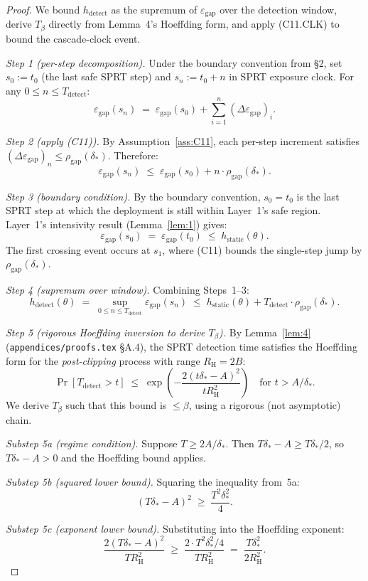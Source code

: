 \documentclass{article}
\newcommand{\deltastar}{\delta_{*}}
\newcommand{\rhogap}{\rho_{\mathrm{gap}}}
\newcommand{\epsgap}{\varepsilon_{\mathrm{gap}}}
\newcommand{\Tbeta}{T_{\beta}}
\newcommand{\Bclip}{B}
\newcommand{\Rh}{R_{\mathrm{H}}}
\begin{document}
\begin{proof}
We bound $h_{\mathrm{detect}}$ as the supremum of $\epsgap$ over
the detection window, derive $\Tbeta$ directly from Lemma~4's
Hoeffding form, and apply (C11.CLK) to bound the cascade-clock
event.

\emph{Step 1 (per-step decomposition).}  Under the boundary
convention from §2, set $s_0 := t_0$ (the last safe SPRT step) and
$s_n := t_0 + n$ in SPRT exposure clock.  For any
$0 \leq n \leq T_{\mathrm{detect}}$:
\[
  \epsgap(s_n) \;=\; \epsgap(s_0) + \sum_{i=1}^{n}
  (\Delta \epsgap)_i.
\]

\emph{Step 2 (apply (C11)).}  By Assumption~\ref{ass:C11}, each
per-step increment satisfies $(\Delta \epsgap)_n \leq
\rhogap(\deltastar)$.  Therefore:
\[
  \epsgap(s_n) \;\leq\; \epsgap(s_0) + n \cdot
  \rhogap(\deltastar).
\]

\emph{Step 3 (boundary condition).}  By the boundary convention,
$s_0 = t_0$ is the last SPRT step at which the deployment is still
within Layer~1's safe region.  Layer~1's intensivity result
(Lemma~\ref{lem:1}) gives:
\[
  \epsgap(s_0) \;=\; \epsgap(t_0) \;\leq\;
  h_{\mathrm{static}}(\theta).
\]
The first crossing event occurs at $s_1$, where (C11) bounds the
single-step jump by $\rhogap(\deltastar)$.

\emph{Step 4 (supremum over window).}  Combining Steps~1--3:
\[
  h_{\mathrm{detect}}(\theta) \;=\;
  \sup_{0 \leq n \leq T_{\mathrm{detect}}} \epsgap(s_n)
  \;\leq\; h_{\mathrm{static}}(\theta) +
  T_{\mathrm{detect}} \cdot \rhogap(\deltastar).
\]

\emph{Step 5 (rigorous Hoeffding inversion to derive $\Tbeta$).}
By Lemma~\ref{lem:4} (\texttt{appendices/proofs.tex} §A.4), the
SPRT detection time satisfies the Hoeffding form for the
\emph{post-clipping} process with range $\Rh = 2\Bclip$:
\[
  \Pr[T_{\mathrm{detect}} > t] \;\leq\;
  \exp\!\left(-\frac{2(t \deltastar - A)^2}{t \Rh^2}\right)
  \quad \text{for } t > A/\deltastar.
\]
We derive $\Tbeta$ such that this bound is $\leq \beta$, using a
rigorous (not asymptotic) chain.

\emph{Substep 5a (regime condition).}  Suppose
$T \geq 2A/\deltastar$.  Then $T\deltastar - A \geq T\deltastar/2$,
so $T\deltastar - A > 0$ and the Hoeffding bound applies.

\emph{Substep 5b (squared lower bound).}  Squaring the inequality
from~5a:
\[
  (T\deltastar - A)^2 \;\geq\; \frac{T^2 \deltastar^2}{4}.
\]

\emph{Substep 5c (exponent lower bound).}  Substituting into the
Hoeffding exponent:
\[
  \frac{2(T\deltastar - A)^2}{T \Rh^2} \;\geq\;
  \frac{2 \cdot T^2 \deltastar^2 / 4}{T \Rh^2} \;=\;
  \frac{T \deltastar^2}{2 \Rh^2}.
\]


\end{proof}
\end{document}
